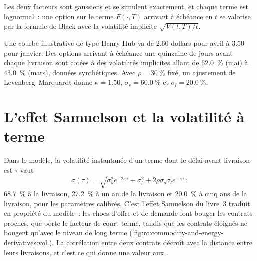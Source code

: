 Les deux facteurs sont gaussiens et se simulent exactement, et chaque terme est lognormal~: une option
sur le terme $F(\cdot,T)$ arrivant à échéance en $t$ se valorise par la formule de Black avec la
volatilité implicite $\sqrt{V(t,T)/t}$.

\begin{example}[calibration]\label{ex:rc:commodity-and-energy-derivatives:calib}
Une courbe illustrative de type Henry Hub va de 2.60 dollars pour avril à 3.50 pour janvier.
Des options arrivant à échéance une quinzaine de jours avant chaque livraison sont cotées à des volatilités implicites
allant de 62.0~\% (mai) à 43.0~\% (mars), données synthétiques. Avec $\rho = 30~\%$ fixé, un
ajustement de Levenberg--Marquardt donne $\kappa = 1.50$, $\sigma_s = 60.0~\%$ et $\sigma_l = 20.0~\%$.
\end{example}

\section{L'effet Samuelson et la volatilité à terme}

Dans le modèle, la volatilité instantanée d'un terme dont le délai avant livraison est $\tau$ vaut
\[
\sigma(\tau) = \sqrt{\sigma_s^2e^{-2\kappa\tau}+\sigma_l^2+2\rho\sigma_s\sigma_le^{-\kappa\tau}}:
\]
68.7~\% à la livraison, 27.2~\% à un an
de la livraison et 20.0~\% à cinq ans de la livraison, pour les paramètres calibrés. C'est l'effet Samuelson
du livre~3 traduit en propriété du modèle~: les chocs d'offre et de demande font bouger les contrats proches,
que porte le facteur de court terme, tandis que les contrats éloignés ne bougent qu'avec le
niveau de long terme (\cref{fig:rc:commodity-and-energy-derivatives:vol}). La corrélation entre deux
contrats décroît avec la distance entre leurs livraisons, et c'est ce qui donne une valeur aux .

